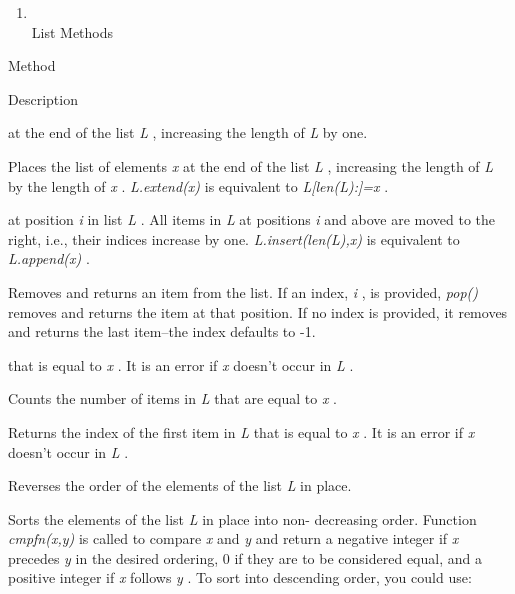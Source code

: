 \begin{enumerate}
\tightlist
\item
  \\
  List Methods
\end{enumerate}

Method

Description



 at the end of the
list \emph{L} , increasing the length of \emph{L} by one.



Places the list of elements
\emph{x} at the end of the list \emph{L} , increasing the length of
\emph{L} by the length of \emph{x} . \emph{L.extend(x)} is equivalent to
\emph{L{[}len(L):{]}=x} .



 at position
\emph{i} in list \emph{L} . All items in \emph{L} at positions \emph{i}
and above are moved to the right, i.e., their indices increase by one.
\emph{L.insert(len(L),x)} is equivalent to \emph{L.append(x)} .





Removes and returns an item from
the list. If an index, \emph{i} , is provided, \emph{pop()} removes and
returns the item at that position. If no index is provided, it removes
and returns the last item--the index defaults to -1.




that is equal to \emph{x} . It is an error if \emph{x} doesn't occur in
\emph{L} .



Counts the number of items in
\emph{L} that are equal to \emph{x} .



Returns the index of the first item
in \emph{L} that is equal to \emph{x} . It is an error if \emph{x}
doesn't occur in \emph{L} .



Reverses the order of the elements
of the list \emph{L} in place.





Sorts the elements of the list
\emph{L} in place into non- decreasing order. Function \emph{cmpfn(x,y)}
is called to compare \emph{x} and \emph{y} and return a negative integer
if \emph{x} precedes \emph{y} in the desired ordering, 0 if they are to
be considered equal, and a positive integer if \emph{x} follows \emph{y}
. To sort into descending order, you could use:

